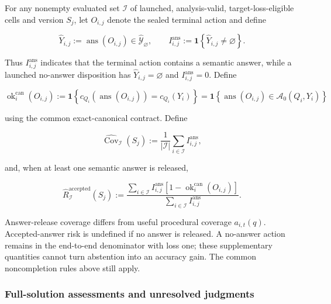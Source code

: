 \documentclass[10pt]{article} %
\providecommand{\1}{\mathbf{1}}  %
\theoremstyle{remark}
\theoremstyle{definition}
\begin{document}
For any nonempty evaluated set $\mathcal I$ of launched, analysis-valid, target-loss-eligible cells and version $S_j$, let $O_{i,j}$ denote the sealed terminal action and define

\begin{equation}
\widehat Y_{i,j}
:=
\operatorname{ans}(O_{i,j})
\in
\widehat{\mathcal Y}_{\varnothing},
\qquad
I_{i,j}^{\mathrm{ans}}
:=
\mathbf 1\!\left\{\widehat Y_{i,j}\neq\varnothing\right\}.
\label{eq:empirical-answer-presence}
\end{equation}

Thus $I_{i,j}^{\mathrm{ans}}$ indicates that the terminal action contains a semantic answer, while a launched no-answer disposition has $\widehat Y_{i,j}=\varnothing$ and $I_{i,j}^{\mathrm{ans}}=0$. Define

\begin{equation}
\operatorname{ok}^{\mathrm{can}}_i(O_{i,j})
:=
\mathbf 1\!\left\{
c_{Q_i}\!\left(\operatorname{ans}(O_{i,j})\right)
=
c_{Q_i}(Y_i)
\right\}
=
\mathbf 1\!\left\{
\operatorname{ans}(O_{i,j})\in\mathcal A_0(Q_i,Y_i)
\right\}
\label{eq:empirical-acceptance-flag}
\end{equation}

using the common exact-canonical contract. Define

\begin{equation}
\widehat{\operatorname{Cov}}_{\mathcal I}(S_j)
:=
\frac{1}{|\mathcal I|}
\sum_{i\in\mathcal I}I_{i,j}^{\mathrm{ans}},
\label{eq:empirical-coverage}
\end{equation}

and, when at least one semantic answer is released,

\begin{equation}
\widehat R_{\mathcal I}^{\mathrm{accepted}}(S_j)
:=
\frac{
\sum_{i\in\mathcal I}
I_{i,j}^{\mathrm{ans}}
\left[1-\operatorname{ok}^{\mathrm{can}}_i(O_{i,j})\right]
}{
\sum_{i\in\mathcal I}I_{i,j}^{\mathrm{ans}}
}.
\label{eq:empirical-accepted-risk}
\end{equation}

Answer-release coverage differs from useful procedural coverage
$a_{i,t}(q)$. Accepted-answer risk is undefined if no answer is released.
A no-answer action remains in the end-to-end denominator with loss one;
these supplementary quantities cannot turn abstention into an accuracy
gain. The common noncompletion rules above still apply.

\subsubsection{Full-solution assessments and unresolved judgments}
\label{subsubsec:full-solution-assessments}
\end{document}

